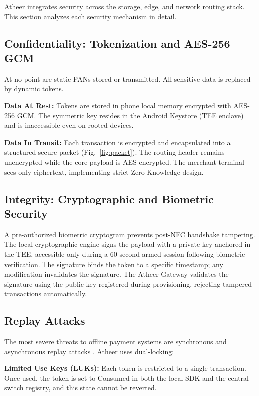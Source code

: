 \documentclass[conference,10pt]{IEEEtran}
\begin{document}
Atheer integrates security across the storage, edge, and network routing stack. This section analyzes each security mechanism in detail.

\subsection{Confidentiality: Tokenization and AES-256 GCM}

At no point are static PANs stored or transmitted. All sensitive data is replaced by dynamic tokens.

\textbf{Data At Rest:} Tokens are stored in phone local memory encrypted with AES-256 GCM. The symmetric key resides in the Android Keystore (TEE enclave) and is inaccessible even on rooted devices.

\textbf{Data In Transit:} Each transaction is encrypted and encapsulated into a structured secure packet (Fig.~\ref{fig:packet}). The routing header remains unencrypted while the core payload is AES-encrypted. The merchant terminal sees only ciphertext, implementing strict Zero-Knowledge design.

\subsection{Integrity: Cryptographic and Biometric Security}

A pre-authorized biometric cryptogram prevents post-NFC handshake tampering. The local cryptographic engine signs the payload with a private key anchored in the TEE, accessible only during a 60-second armed session following biometric verification. The signature binds the token to a specific timestamp; any modification invalidates the signature. The Atheer Gateway validates the signature using the public key registered during provisioning, rejecting tampered transactions automatically.

\subsection{Replay Attacks}

The most severe threats to offline payment systems are synchronous and asynchronous replay attacks \cite{hancke2010}. Atheer uses dual-locking:

\textbf{Limited Use Keys (LUKs):} Each token is restricted to a single transaction. Once used, the token is set to Consumed in both the local SDK and the central switch registry, and this state cannot be reverted.
\end{document}
